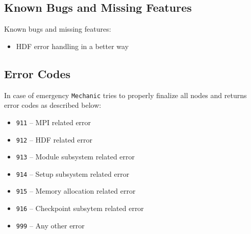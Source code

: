 \subsection{Known Bugs and Missing Features}\label{troubleshooting_bugs}
Known bugs and missing features:

\begin{itemize}
\item HDF error handling in a better way\end{itemize}
\subsection{Error Codes}\label{troubleshooting_errcodes}
In case of emergency {\tt Mechanic} tries to properly finalize all nodes and returns error codes as described below:

\begin{itemize}
\item {\tt 911} -- MPI related error\item {\tt 912} -- HDF related error\item {\tt 913} -- Module subsystem related error\item {\tt 914} -- Setup subsystem related error\item {\tt 915} -- Memory allocation related error\item {\tt 916} -- Checkpoint subsytem related error\item {\tt 999} -- Any other error \end{itemize}
